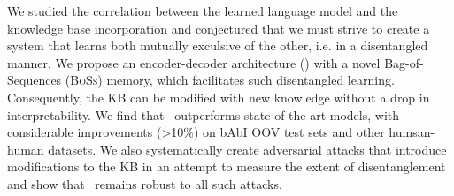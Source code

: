 
We studied the correlation between the learned language model and the knowledge base incorporation and conjectured that we must strive to create a system that learns both mutually exculsive of the other, i.e. in a disentangled manner.
We propose an encoder-decoder architecture (\sys) with a novel Bag-of-Sequences (\textsc{BoSs}) memory, which facilitates such disentangled learning. Consequently, the KB can be modified with new knowledge without a drop in interpretability. We find that \sys\ outperforms state-of-the-art models, with considerable improvements (\textgreater10\%) on bAbI OOV test sets and other humsan-human datasets. We also systematically create adversarial attacks that introduce modifications to the KB in an attempt to measure the extent of disentanglement and show that \sys\ remains robust to all such attacks.

